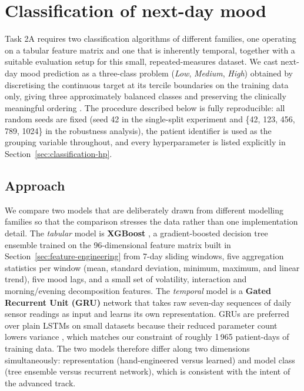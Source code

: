 
\section{Classification of next-day mood}\label{sec:classification}

Task 2A requires two classification algorithms of different families, one operating on a tabular feature matrix and one that is inherently temporal, together with a suitable evaluation setup for this small, repeated-measures dataset. We cast next-day mood prediction as a three-class problem (\textit{Low}, \textit{Medium}, \textit{High}) obtained by discretising the continuous target at its tercile boundaries on the training data only, giving three approximately balanced classes and preserving the clinically meaningful ordering \cite{altman2006categorising}. The procedure described below is fully reproducible: all random seeds are fixed (seed 42 in the single-split experiment and \{42, 123, 456, 789, 1024\} in the robustness analysis), the patient identifier is used as the grouping variable throughout, and every hyperparameter is listed explicitly in Section~\ref{sec:classification-hp}.

\subsection{Approach}\label{sec:classification-approach}

We compare two models that are deliberately drawn from different modelling families so that the comparison stresses the data rather than one implementation detail. The \textit{tabular} model is \textbf{XGBoost} \cite{chen2016xgboost}, a gradient-boosted decision tree ensemble trained on the 96-dimensional feature matrix built in Section~\ref{sec:feature-engineering} from 7-day sliding windows, five aggregation statistics per window (mean, standard deviation, minimum, maximum, and linear trend), five mood lags, and a small set of volatility, interaction and morning/evening decomposition features. The \textit{temporal} model is a \textbf{Gated Recurrent Unit (GRU)} network \cite{cho2014gru} that takes raw seven-day sequences of daily sensor readings as input and learns its own representation. GRUs are preferred over plain LSTMs on small datasets because their reduced parameter count lowers variance \cite{chung2014empirical}, which matches our constraint of roughly 1\,965 patient-days of training data. The two models therefore differ along two dimensions simultaneously: representation (hand-engineered versus learned) and model class (tree ensemble versus recurrent network), which is consistent with the intent of the advanced track.


